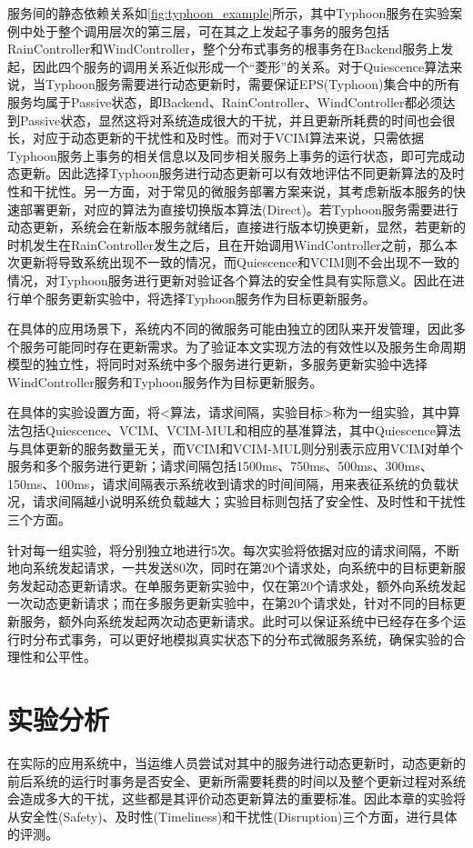 \documentclass[macfonts,master]{njuthesis}
\begin{document}
服务间的静态依赖关系如\ref{fig:typhoon_example}所示，其中Typhoon服务在实验案例中处于整个调用层次的第三层，可在其之上发起子事务的服务包括RainController和WindController，整个分布式事务的根事务在Backend服务上发起，因此四个服务的调用关系近似形成一个“菱形”的关系。对于Quiescence算法来说，当Typhoon服务需要进行动态更新时，需要保证EPS(Typhoon)集合中的所有服务均属于Passive状态，即Backend、RainController、WindController都必须达到Passive状态，显然这将对系统造成很大的干扰，并且更新所耗费的时间也会很长，对应于动态更新的干扰性和及时性。而对于VCIM算法来说，只需依据Typhoon服务上事务的相关信息以及同步相关服务上事务的运行状态，即可完成动态更新。因此选择Typhoon服务进行动态更新可以有效地评估不同更新算法的及时性和干扰性。另一方面，对于常见的微服务部署方案来说，其考虑新版本服务的快速部署更新，对应的算法为直接切换版本算法(Direct)。若Typhoon服务需要进行动态更新，系统会在新版本服务就绪后，直接进行版本切换更新，显然，若更新的时机发生在RainController发生之后，且在开始调用WindController之前，那么本次更新将导致系统出现不一致的情况，而Quiescence和VCIM则不会出现不一致的情况，对Typhoon服务进行更新对验证各个算法的安全性具有实际意义。因此在进行单个服务更新实验中，将选择Typhoon服务作为目标更新服务。

在具体的应用场景下，系统内不同的微服务可能由独立的团队来开发管理，因此多个服务可能同时存在更新需求。为了验证本文实现方法的有效性以及服务生命周期模型的独立性，将同时对系统中多个服务进行更新，多服务更新实验中选择WindController服务和Typhoon服务作为目标更新服务。

在具体的实验设置方面，将<算法，请求间隔，实验目标>称为一组实验，其中算法包括Quiescence、VCIM、VCIM-MUL和相应的基准算法，其中Quiescence算法与具体更新的服务数量无关，而VCIM和VCIM-MUL则分别表示应用VCIM对单个服务和多个服务进行更新；请求间隔包括1500ms、750ms、500ms、300ms、150ms、100ms，请求间隔表示系统收到请求的时间间隔，用来表征系统的负载状况，请求间隔越小说明系统负载越大；实验目标则包括了安全性、及时性和干扰性三个方面。

针对每一组实验，将分别独立地进行5次。每次实验将依据对应的请求间隔，不断地向系统发起请求，一共发送80次，同时在第20个请求处，向系统中的目标更新服务发起动态更新请求。在单服务更新实验中，仅在第20个请求处，额外向系统发起一次动态更新请求；而在多服务更新实验中，在第20个请求处，针对不同的目标更新服务，额外向系统发起两次动态更新请求。此时可以保证系统中已经存在多个运行时分布式事务，可以更好地模拟真实状态下的分布式微服务系统，确保实验的合理性和公平性。

\section{实验分析}
在实际的应用系统中，当运维人员尝试对其中的服务进行动态更新时，动态更新的前后系统的运行时事务是否安全、更新所需要耗费的时间以及整个更新过程对系统会造成多大的干扰，这些都是其评价动态更新算法的重要标准。因此本章的实验将从安全性(Safety)、及时性(Timeliness)和干扰性(Disruption)三个方面，进行具体的评测。
\end{document}
